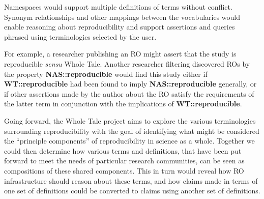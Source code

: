 Namespaces would support multiple definitions of terms without conflict.
Synonym relationships and other mappings between the vocabularies would enable reasoning about reproducibility
	 and support assertions and queries phrased using terminologies selected by the user.

         For example, a researcher publishing an RO might assert that the study is reproducible \emph{sensu} \textsf{Whole Tale}.  Another researcher filtering discovered ROs by the property \textbf{NAS::reproducible} would find this study
         either if \textbf{WT::reproducible} had been found to imply \textbf{NAS::reproducible} generally, or if other assertions made by the author
         about the RO satisfy the requirements of the latter term in conjunction with the implications of \textbf{WT::reproducible}.

         Going forward, the Whole Tale project aims to explore the various terminologies surrounding reproducibility with the goal of identifying what might be considered the ``principle components'' of reproducibility in science as a whole.  Together we could then determine how various terms and definitions,
that have been put forward to meet the needs of particular research communities, can be seen as compositions of these shared components.  
This in turn would reveal how RO infrastructure should reason about these terms, 
	and how claims made in terms of one set of definitions could be converted to claims using another set of definitions.


